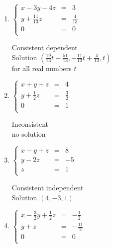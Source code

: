 \documentclass{ximera}
\begin{document}
\begin{enumerate}
Consistent independent\\
Solution $\left(\frac{1}{3},\frac{2}{3},1\right)$



\item $\left\{ \begin{array}{rcr} x-3y-4z & = & 3  \\ y + \frac{11}{13} z & = & \frac{4}{13} \\ 0 & = & 0 \\  \end{array} \right.$
 

Consistent dependent\\
Solution $\left(\frac{19}{13} t + \frac{51}{13},-\frac{11}{13} t+\frac{4}{13},t\right)$\\
for all real numbers $t$


\item $\left\{ \begin{array}{rcr} x+y+z & = & 4  \\ y + \frac{1}{2} z & = & \frac{3}{2} \\ 0 & = & 1 \\  \end{array} \right.$
 

Inconsistent\\
no solution



\item $\left\{ \begin{array}{rcr} x-  y +  z & = & 8  \\ y -2z & = & -5 \\ z & = & 1 \\  \end{array} \right.$
 

Consistent independent\\
Solution $\left(4,-3,1\right)$




\item $\left\{ \begin{array}{rcr} x- \frac{3}{2} y + \frac{1}{2} z & = & -\frac{1}{2}  \\[3pt] y +  z & = & -\frac{11}{2} \\ 0 & = & 0 \\  \end{array} \right.$
 


\end{enumerate}
\end{document}
